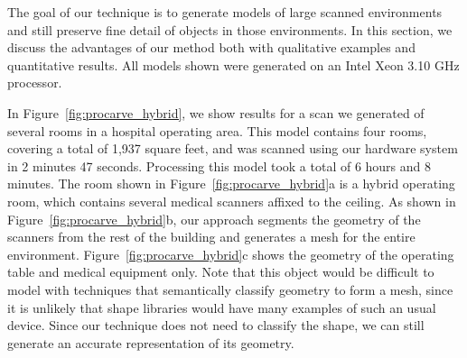 \documentclass[12pt,onecolumn,oneside]{book}
\begin{document}
The goal of our technique is to generate models of large scanned environments and still preserve fine detail of objects in those environments.  In this section, we discuss the advantages of our method both with qualitative examples and quantitative results.  All models shown were generated on an Intel Xeon 3.10 GHz processor.

In Figure~\ref{fig:procarve_hybrid}, we show results for a scan we generated of several rooms in a hospital operating area.  This model contains four rooms, covering a total of 1,937 square feet, and was scanned using our hardware system in 2 minutes 47 seconds.  Processing this model took a total of 6 hours and 8 minutes.  The room shown in Figure~\ref{fig:procarve_hybrid}a is a hybrid operating room, which contains several medical scanners affixed to the ceiling.  As shown in Figure~\ref{fig:procarve_hybrid}b, our approach segments the geometry of the scanners from the rest of the building and generates a mesh for the entire environment.  Figure~\ref{fig:procarve_hybrid}c shows the geometry of the operating table and medical equipment only.  Note that this object would be difficult to model with techniques that semantically classify geometry to form a mesh, since it is unlikely that shape libraries would have many examples of such an usual device.  Since our technique does not need to classify the shape, we can still generate an accurate representation of its geometry.
\end{document}
